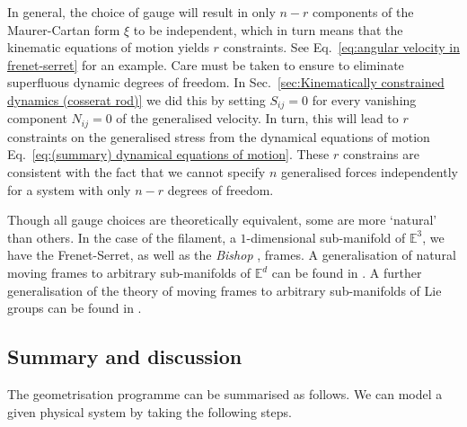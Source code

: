 In general, the choice of gauge will result in only $n-r$ components of the Maurer-Cartan form $\xi$ to be independent, which in turn means that the kinematic equations of motion yields $r$ constraints. See Eq.~\ref{eq:angular velocity in frenet-serret} for an example. Care must be taken to ensure to eliminate superfluous dynamic degrees of freedom. In Sec.~\ref{sec:Kinematically constrained dynamics (cosserat rod)} we did this by setting $S_{ij} = 0$ for every vanishing component $N_{ij}=0$ of the generalised velocity. In turn, this will lead to $r$ constraints on the generalised stress from the dynamical equations of motion Eq.~\ref{eq:(summary) dynamical equations of motion}. These $r$ constrains are consistent with the fact that we cannot specify $n$ generalised forces independently for a system with only $n-r$ degrees of freedom.

Though all gauge choices are theoretically equivalent, some are more `natural' than others. In the case of the filament, a $1$-dimensional sub-manifold of $\mathbb{E}^3$, we have the Frenet-Serret, as well as the \textit{Bishop} \citep{bishopThereMoreOne1975a, carrollImprovingFrenetFrame2013}, frames. A generalisation of natural moving frames to arbitrary sub-manifolds of $\mathbb{E}^d$ can be found in \citep{cartanGeometryRiemannianSpaces1983, cartanTheorieGroupesFinis1937, levyReviewElieCartan1935}. A further generalisation of the theory of moving frames to arbitrary sub-manifolds of Lie groups can be found in \citep{olverSurveyMovingFrames2005, felsMovingCoframesPractical1998, felsMovingCoframesII1999, olverModernDevelopmentsTheory}.



\subsection{Summary and discussion} \label{sec:geometrisation discussion}

The geometrisation programme can be summarised as follows. We can model a given physical system by taking the following steps.

